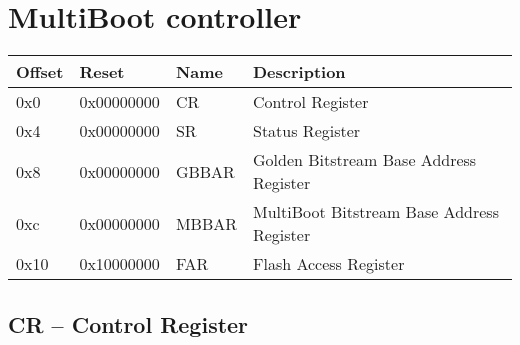 \section{MultiBoot controller}
\label{app:memmap}

{
\begin{longtable}{l l l p{}}
\hline
\textbf{Offset} & \textbf{Reset} & \textbf{Name} 
		& \textbf{Description} \\
\hline
\endfirsthead
\hline
\hline
\endhead
\hline
\endfoot
0x0 &  0x00000000 & CR & Control Register\\
0x4 &  0x00000000 & SR & Status Register\\
0x8 &  0x00000000 & GBBAR & Golden Bitstream Base Address Register\\
0xc &  0x00000000 & MBBAR & MultiBoot Bitstream Base Address Register\\
0x10 & 0x10000000 & FAR & Flash Access Register\\
\end{longtable}
}

\vspace{11pt}
\subsection{CR -- Control Register}
\label{app:memmap-cr}

\vspace{11pt}
\noindent
{}

